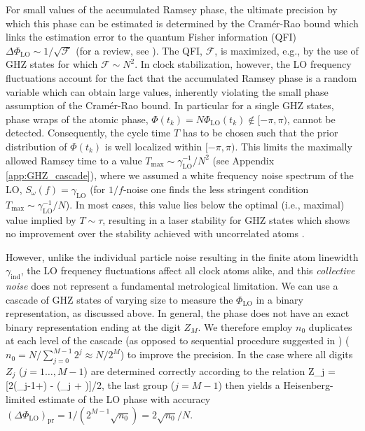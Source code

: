 For small values of the accumulated Ramsey phase, the ultimate precision by
which this phase can be estimated is determined by the Cram\'{e}r-Rao bound
\cite{Rao1945,Giovanetti2011} which 
links the estimation error to the quantum Fisher information (QFI)
$\Delta\Phi_\mathrm{LO} \sim 1/\sqrt{\mathcal F}$ (for a review, see
\cite{Giovanetti2011}). The QFI, $\mathcal F$, is maximized, e.g., by the use of
GHZ states for which $\mathcal F \sim N^2$.
In clock stabilization, however, the LO frequency fluctuations account for the
fact that the accumulated Ramsey phase is a random variable which can obtain
large values, inherently violating the small phase assumption of the
Cram\'{e}r-Rao bound.
In particular for a single GHZ states, phase wraps of the atomic phase,
$\Phi(t_k)=N \Phi_\mathrm{LO}(t_k)\notin[-\pi,\pi)$, cannot be detected.
Consequently, the cycle time $T$ has to be
chosen such that the prior distribution of $\Phi(t_k)$ is well localized
within $[-\pi,\pi)$.
This limits the maximally allowed Ramsey time to a value $T_\mathrm{max}
\sim\gamma_\mathrm{LO}^{-1}/N^2$ (see 
Appendix \ref{app:GHZ_cascade}), where we assumed a white frequency noise
spectrum of the LO, $S_\omega(f) = \gamma_\mathrm{LO}$ (for $1/f$-noise one finds the less stringent
condition $T_\mathrm{max} \sim\gamma_\mathrm{LO}^{-1}/N$). In most cases, this value
lies below the optimal (i.e., maximal) value implied by
 $T\sim\tau$, resulting in a laser stability for GHZ
states which shows no improvement over the stability achieved with uncorrelated
atoms \cite{Wineland1998, Rosenband2012_numerical}.

However, unlike the individual particle noise resulting in the finite atom
linewidth $\gamma_\mathrm{ind}$, the LO frequency fluctuations affect all clock
atoms alike, and this \textit{collective noise} does not represent a fundamental
metrological limitation.
We can use a cascade of GHZ states of varying size to measure the
$\Phi_\mathrm{LO}$ in a binary representation, as discussed above.
In general, the phase does not have an exact binary representation ending at the
digit $Z_{M}$. We therefore employ $n_0$ duplicates  at each level of the
cascade (as opposed to sequential procedure suggested in \cite{Giovannetti2006})
($n_0 =N/\sum_{j=0}^{M-1} 2^j \approx N/2^M$) to improve the precision.
 In the case where all digits $Z_j$ ($j=1\dots, M-1$) are determined correctly
 according to the relation
\bel
Z_j =
[2(\Phi_{j-1}+\pi) - (\Phi_j + \pi)]/2\pi,
\eel
the last group ($j=M-1$) then yields a Heisenberg-limited estimate of
the LO phase with accuracy $(\Delta\Phi_\mathrm{LO})_\mathrm{pr} =
1/(2^{M-1} \sqrt{n_0}) = 2\sqrt{n_0}/N$.

